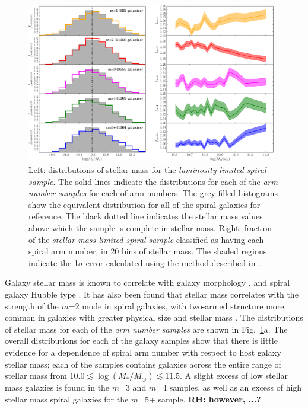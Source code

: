 \documentclass[useAMS,usenatbib]{mn2e}
\newcommand{\rh}[1]{{\bf \textcolor{RoyalPurple}{RH: #1}}}
\begin{document}
\begin{figure}
		\centering

        \includegraphics[width=0.975\textwidth]{Images/Results/mass_plots.pdf}

        \caption{Left: distributions of stellar mass for the \textit{luminosity-limited spiral sample}. The solid lines indicate the distributions for each of the \textit{arm number samples} for each of arm numbers. The grey filled histograms show the equivalent distribution for all of the spiral galaxies for reference. The black dotted line indicates the stellar mass values above which the sample is complete in stellar mass. Right: fraction of the \textit{stellar mass-limited spiral sample} classified as having each spiral arm number, in 20 bins of stellar mass. The shaded regions indicate the 1$\sigma$ error calculated using the method described in \citet{Cameron_11}.}

        \label{fig:mass_plots}

\end{figure}

Galaxy stellar mass is known to correlate with galaxy morphology \citep{Bamford_09,Kelvin_14}, and spiral galaxy Hubble type \citep{Munoz-Mateos_15}. It has also been found that stellar mass correlates with the strength of the $m$=2 mode in spiral galaxies, with two-armed structure more common in galaxies with greater physical size \citep{EE_87} and stellar mass \citep{Kendall_15}. The distributions of stellar mass for each of the \textit{arm number samples} are shown in Fig.~\ref{fig:mass_plots}a. The overall distributions for each of the galaxy samples show that there is little evidence for a dependence of spiral arm number with respect to host galaxy stellar mass; each of the samples contains galaxies across the entire range of stellar mass from $10.0 \lesssim \log(M_*/M_{\odot}) \lesssim 11.5$. A slight excess of low stellar mass galaxies is found in the $m$=3 and $m$=4 samples, as well as an excess of high stellar mass spiral galaxies for the $m$=5+ sample. \rh{however, ...?}
\end{document}
